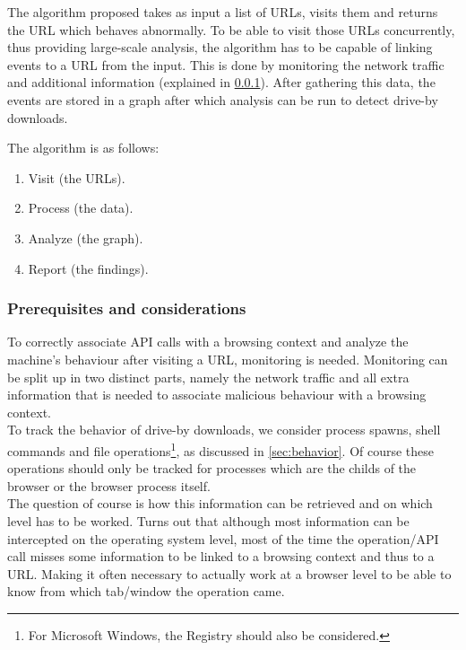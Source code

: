The algorithm proposed takes as input a list of URLs, visits them and returns the URL which behaves abnormally. To be able to visit those URLs concurrently, thus providing large-scale analysis, the algorithm has to be capable of linking events to a URL from the input. This is done by monitoring the network traffic and additional information (explained in \ref{sec:prereq}). After gathering this data, the events are stored in a graph after which analysis can be run to detect drive-by downloads.

The algorithm is as follows:

\begin{changemargin}{5cm}{0cm}
\begin{enumerate}
\item Visit (the URLs).
\item Process (the data).
\item Analyze (the graph).
\item Report (the findings).
\end{enumerate}
\end{changemargin}

\subsubsection{Prerequisites and considerations}
\label{sec:prereq}

To correctly associate API calls with a browsing context and analyze the machine's behaviour after visiting a URL, monitoring is needed. Monitoring can be split up in two distinct parts, namely the network traffic and all extra information that is needed to associate malicious behaviour with a browsing context.\\

To track the behavior of drive-by downloads, we consider process spawns, shell commands and file operations\footnote{For Microsoft Windows, the Registry should also be considered.}, as discussed in \ref{sec:behavior}. Of course these operations should only be tracked for processes which are the childs of the browser or the browser process itself.\\

The question of course is how this information can be retrieved and on which level has to be worked. Turns out that although most information can be intercepted on the operating system level, most of the time the operation/API call misses some information to be linked to a browsing context and thus to a URL. Making it often necessary to actually work at a browser level to be able to know from which tab/window the operation came.\\%

